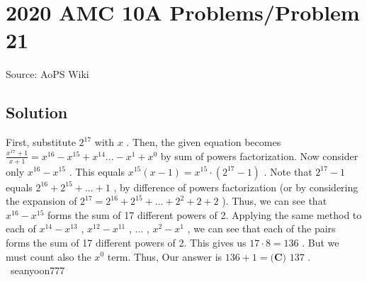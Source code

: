 \documentclass[12pt]{article}
\begin{document}
\section*{{2020 AMC 10A Problems/Problem 21}}
Source: AoPS Wiki

\subsection*{Solution}
First, substitute $2^{17}$ with $x$ .
Then, the given equation becomes $\frac{x^{17}+1}{x+1}=x^{16}-x^{15}+x^{14}...-x^1+x^0$ by sum of powers factorization.
Now consider only $x^{16}-x^{15}$ . This equals $x^{15}(x-1)=x^{15} \cdot (2^{17}-1)$ .
Note that $2^{17}-1$ equals $2^{16}+2^{15}+...+1$ , by difference of powers factorization (or by considering the expansion of $2^{17}=2^{16}+2^{15}+...+2^{2}+2 + 2$ ).
Thus, we can see that $x^{16}-x^{15}$ forms the sum of 17 different powers of 2.
Applying the same method to each of $x^{14}-x^{13}$ , $x^{12}-x^{11}$ , ... , $x^{2}-x^{1}$ , we can see that each of the pairs forms the sum of 17 different powers of 2. This gives us $17 \cdot 8=136$ .
But we must count also the $x^0$ term.
Thus, Our answer is $136+1=\boxed{\textbf{(C) } 137}$ . ~seanyoon777
\end{document}

